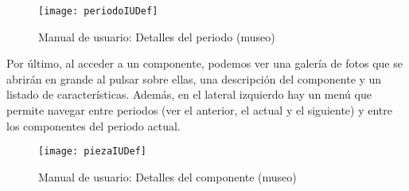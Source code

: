 \begin{figure}[H]
\centering
\centerline{\texttt{[image: periodoIUDef]}}
\caption{Manual de usuario: Detalles del periodo (museo)}
\end{figure}
Por último, al acceder a un componente, podemos ver una galería de fotos que se abrirán en grande al pulsar sobre ellas, una descripción del componente y un listado de características. Además, en el lateral izquierdo hay un menú que permite navegar entre periodos (ver el anterior, el actual y el siguiente) y entre los componentes del periodo actual.
\begin{figure}[H]
\centering
\centerline{\texttt{[image: piezaIUDef]}}
\caption{Manual de usuario: Detalles del componente (museo)}
\end{figure}

